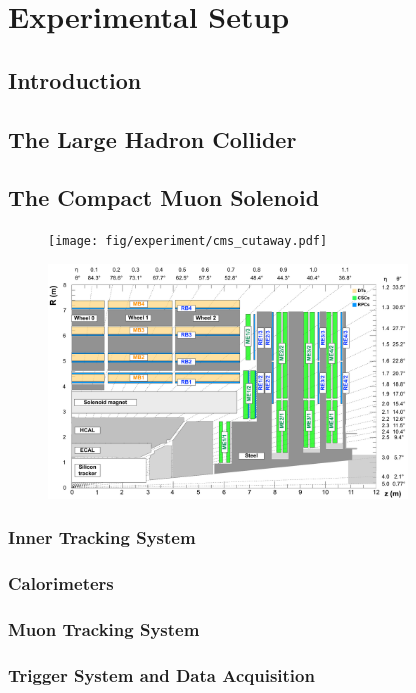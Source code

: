 
\chapter{Experimental Setup}
\label{chap:exp}

\section{Introduction}

\section{The Large Hadron Collider}
\label{sec:LHC}

\section{The Compact Muon Solenoid}
\label{sec:CMS}

\begin{figure}[htbp] %
  \centering
  \texttt{[image: fig/experiment/cms\_cutaway.pdf]}
  \caption{}
  \label{fig:CMSCut}
\end{figure}

\begin{figure}[htbp]
  \centering
  \includegraphics[width=0.85\textwidth]{fig/experiment/cms_crosssec.pdf}
  \caption{}
  \label{fig:CMSCrosssec}
\end{figure}

\subsection{Inner Tracking System}
\label{subsec:tracking}

\subsection{Calorimeters}
\label{subsec:calorimeter}

\subsection{Muon Tracking System}
\label{subsec:muonTrack}

\subsection{Trigger System and Data Acquisition}
\label{subsec:trigger}
